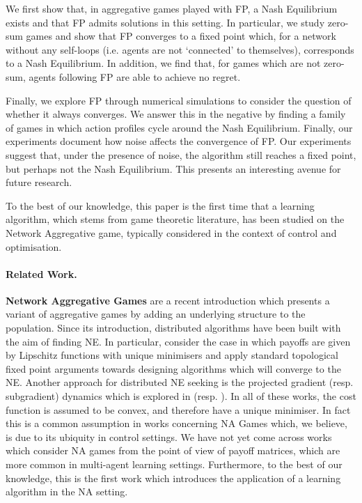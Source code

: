 \documentclass{article}
\theoremstyle{definition}
\begin{document}
  We first show that, in aggregative games played with FP, a Nash Equilibrium exists and that FP admits
  solutions in this setting. In particular, we study zero-sum games and show that
  FP converges to a fixed point which, for a network without any
  self-loops (i.e. agents are not `connected' to themselves), corresponds to a Nash Equilibrium. In addition, we find that, for games
  which are not zero-sum, agents following FP are able to
  achieve no regret.

  Finally, we explore FP through numerical simulations to consider the
  question of whether it always converges. We answer this in the negative by finding a family of
  games in which action profiles cycle around the Nash Equilibrium. Finally, our experiments
  document how noise affects the convergence of FP. Our experiments suggest that, under
  the presence of noise, the algorithm still reaches a fixed point, but perhaps not the Nash
  Equilibrium. This presents an interesting avenue for future research.
  
  To the best of our knowledge, this paper is the first time that a learning algorithm, which stems from game theoretic literature, has been studied on the Network Aggregative game, typically considered in the context of control and optimisation. 

\paragraph{Related Work.}

\textbf{Network Aggregative Games}
are a recent introduction \cite{Parise2015} which presents
a variant of aggregative games by adding an underlying structure to
the population. Since its introduction, distributed algorithms have
been built with the aim of finding NE. In particular,
\cite{Parise2015, Parise2020} consider the case in which payoffs are
given by Lipschitz functions with unique minimisers and apply standard
topological fixed point arguments towards designing algorithms which will
converge to the NE. Another approach for distributed NE seeking is the
projected gradient (resp. subgradient) dynamics which is explored in
\cite{Zhu2021} (resp. \cite{Shokri2020, Shokri2021}). In all of these
works, the cost function is assumed to be convex, and therefore have a
unique minimiser. In fact this is a common assumption in works
concerning NA Games \cite{Zhu2021, Lei2020} which, we believe, is due
to its ubiquity in control settings. We have not yet come across works
which consider NA games from the point of view of payoff matrices,
which are more common in multi-agent learning settings.  Furthermore,
to the best of our knowledge, this is the first work which introduces
the application of a learning algorithm in the NA setting.
\end{document}
